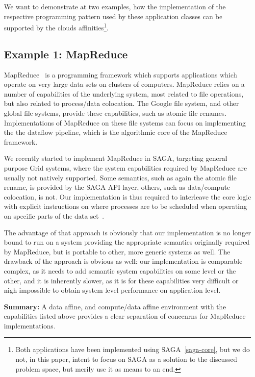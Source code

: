 \documentclass{article}
\newcommand{\B}[1]{\textbf{#1}}
\begin{document}
 We want to demonstrate at two examples, how the implementation of the
 respective programming pattern used by these application classes can
 be supported by the clouds affinities\footnote{Both applications have
 been implemented using SAGA~\ref{saga-core}, but we do not, in this
 paper, intent to focus on SAGA as a solution to the discussed problem
 space, but merily use it as means to an end.}.

 \subsection{Example 1: MapReduce}

  MapReduce~\cite{mapreduce-paper} is a programming framework which supports
  applications which operate on very large data sets on clusters of
  computers.  MapReduce relies on a number of capabilities of the
  underlying system, most related to file operations, but also related
  to process/data colocation.  The Google file system, and other
  global file systems, provide these capabilities, such as atomic file
  renames.  Implementations of MapReduce on these file systems can
  focus on implementing the the dataflow pipeline, which is the
  algorithmic core of the MapReduce framework.

  We recently started to implement MapReduce in SAGA, targeting
  general purpose Grid systems, where the system capabilities required
  by MapReduce are usually not natively supported.  Some semantics,
  such as again the atomic file rename, is provided by the SAGA API
  layer, others, such as data/compute colocation, is not.  Our
  implementation is thus required to interleave the core logic with
  explicit instructions on where processes are to be scheduled when
  operating on specific parts of the data set~\cite{gsoc-saga}.

  The advantage of that approach is obviously that our implementation
  is no longer bound to run on a system providing the appropriate
  semantics originally required by MapReduce, but is portable to
  other, more generic systems as well.  The drawback of the approach
  is obvious as well: our implementation is comparable complex, as it
  needs to add semantic system capabilities on some level or the
  other, and it is inherently slower, as it is for these capabilities
  very difficult or nigh impossible to obtain system level performance
  on application level.

  \B{Summary:} A data affine, and compute/data affine environment with
  the capabilities listed above provides a clear separation of
  concenrns for MapReduce implementations.
\end{document}
